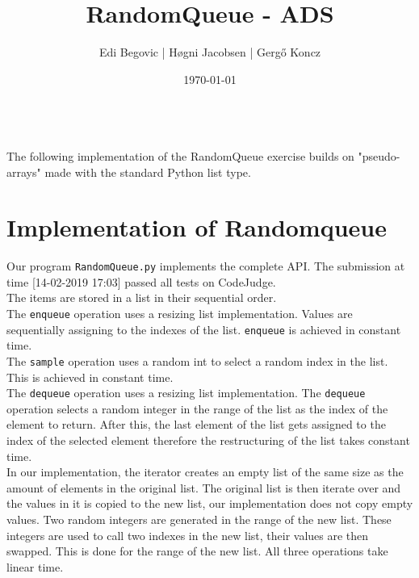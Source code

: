 \documentclass[a4paper]{article}
\title{RandomQueue - ADS}
\author{Edi Begovic | Høgni Jacobsen | Gergő Koncz}
\date{\today}
\begin{document}
 
\maketitle

\ \\
\noindent
The following implementation of the RandomQueue exercise builds on "pseudo-arrays" made 
with the standard Python list type.
\ \\
\section*{Implementation of Randomqueue}

\noindent
Our program \texttt{RandomQueue.py} implements the complete API.
The submission at time [14-02-2019 17:03] passed all tests on CodeJudge. \\

The items are stored in a list in their sequential order. \\

The \texttt{enqueue}  operation uses  a resizing list implementation. Values are sequentially 
assigning to the indexes of the list.
\texttt{enqueue} is achieved in constant time. \\

The \texttt{sample} operation uses a random int to select a random index in the list. This is 
achieved in constant time. \\

The \texttt{dequeue} operation uses  a resizing list implementation. The \texttt{dequeue} 
operation selects a random integer in the range of the list as the index of the element to 
return. After this, the last element of the list gets assigned to the index of the selected 
element therefore the restructuring of the list takes constant time. \\

In our implementation, the iterator creates an empty list of the same size as the amount of 
elements in the original list. The original list is then iterate over and the values in it 
is copied to the new list, our implementation does not copy empty values. Two random integers 
are generated in the range of the new list. These integers are used to call two indexes in 
the new list, their values are then swapped. This is done for the range of the new list. All 
three operations take linear time. \\
\end{document}
